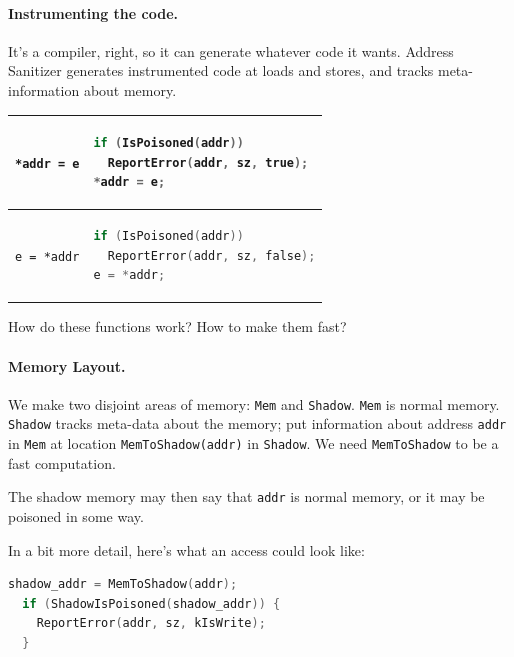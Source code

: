\documentclass[11pt]{article}
\begin{document}
\paragraph{Instrumenting the code.} It's a compiler, right, so
it can generate whatever code it wants. Address Sanitizer generates
instrumented code at loads and stores, and tracks meta-information
about memory.

\begin{tabular}{ll}
 \begin{minipage}{.3\textwidth} \verb+*addr = e+ \end{minipage} & \begin{minipage}{.6\textwidth} \begin{lstlisting}[language=C]
if (IsPoisoned(addr))
  ReportError(addr, sz, true);
*addr = e;
    \end{lstlisting}
        \end{minipage}
\\ \hline
    \begin{minipage}{.3\textwidth} \verb+e = *addr+ \end{minipage} & \begin{minipage}{.6\textwidth} \begin{lstlisting}[language=C]
if (IsPoisoned(addr))
  ReportError(addr, sz, false);
e = *addr;
      \end{lstlisting}
    \end{minipage}
\end{tabular}

How do these functions work? How to make them fast?

\paragraph{Memory Layout.} We make two disjoint areas of memory:
\texttt{Mem} and \texttt{Shadow}. \texttt{Mem} is normal memory.
\texttt{Shadow} tracks meta-data about the memory; put information
about address \texttt{addr} in \texttt{Mem} at location
\texttt{MemToShadow(addr)} in \texttt{Shadow}. We need \texttt{MemToShadow}
to be a fast computation.

The shadow memory may then say that \texttt{addr} is normal memory,
or it may be poisoned in some way.

In a bit more detail, here's what an access could look like:
\begin{lstlisting}[language=C]
  shadow_addr = MemToShadow(addr);
  if (ShadowIsPoisoned(shadow_addr)) {
    ReportError(addr, sz, kIsWrite);
  }
\end{lstlisting}
\end{document}
